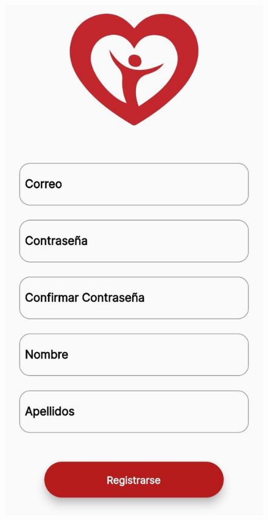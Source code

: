 \begin{figure}[h!]
\begin{center}
\includegraphics[scale=0.15]{Graphics/images/hcvet/create.jpg}
\label{fig:bac}

\end{center}
\end{figure}

